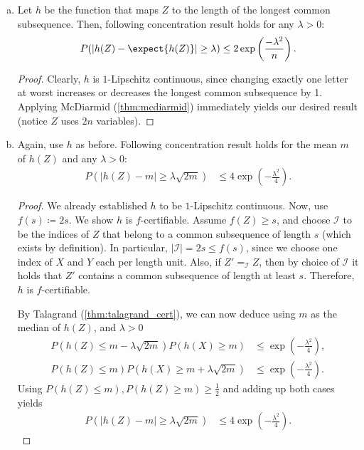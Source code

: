 \begin{aufgabe}
\begin{enumerate}[(a)]
\begin{proof}
        Since our problem yields a lower bound of the expected length, we have shown $\frac{n}{k} \leq l$.
        Strict inequality follows by repeating the process for another starting position in $X$ and taking the maximum of the respective output length.
        The sole existence of instances such that this increases our lower bound suffices to disprove equality, and we do not need to do any exact math with highly correlated processes.
    \end{proof}
    \item  
    Let $h$ be the function that maps $Z$ to the length of the longest common subsequence.
    Then, following concentration result holds for any $\lambda > 0$:
    \begin{align*}
        P(|h(Z) - \expect{h(Z)}| \geq \lambda) \leq 2\exp \left(\frac{-\lambda^2}{n}\right).
    \end{align*}
    \begin{proof}
    Clearly, $h$ is $1$-Lipschitz continuous,
    since changing exactly one letter at worst increases or decreases the longest common subsequence by 1.
    Applying McDiarmid (\autoref{thm:mcdiarmid}) immediately yields our desired result (notice $Z$ uses $2n$ variables).
    \end{proof}
    \item Again, use $h$ as before.
    Following concentration result holds for the mean $m$ of $h(Z)$ and any $\lambda > 0$:
    \begin{align*}
        P(|h(Z) - m | \geq \lambda\sqrt{2m}) &\leq 4\exp\left(-\frac{\lambda^2}{4}\right).
    \end{align*}
    \begin{proof}
        We already established $h$ to be $1$-Lipschitz continuous.
        Now, use $f(s) \coloneqq 2s$. We show $h$ is $f$-certifiable.
        Assume $f(Z) \geq s$, and choose $\mathcal I$ to be the indices of $Z$ that belong to a common subsequence of length $s$ (which exists by definition).
        In particular, $|\mathcal I| = 2s \leq f(s)$, since we choose one index of $X$ and $Y$ each per length unit.
        Also, if $Z' =_{\mathcal I} Z$, then by choice of $\mathcal I$ it holds that $Z'$ contains a common subsequence of length at least $s$. Therefore, $h$ is $f$-certifiable.
    
        By Talagrand (\autoref{thm:talagrand_cert}), we can now deduce using $m$ as the median of $h(Z)$, and $\lambda > 0$
        \begin{align*}
            P(h(Z) \leq m - \lambda\sqrt{2m})P(h(X) \geq m) &\leq \exp\left(-\frac{\lambda^2}{4}\right), \\
            P(h(Z) \leq m )P(h(X) \geq m + \lambda\sqrt{2m}) &\leq \exp\left(-\frac{\lambda^2}{4}\right).
        \end{align*}
        Using $P(h(Z) \leq m), P(h(Z) \geq m) \geq \frac{1}{2}$ and adding up both cases yields
            \begin{align*}
                P(|h(Z) - m | \geq \lambda\sqrt{2m}) &\leq 4\exp\left(-\frac{\lambda^2}{4}\right).
            \end{align*}


\end{proof}
\end{enumerate}
\end{aufgabe}
